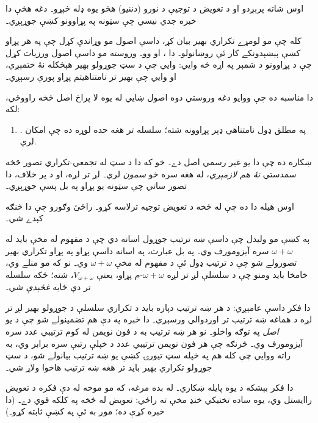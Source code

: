 \documentclass[../../../include/open-logic-section]{subfiles}
\begin{document}

اوس \limofsize{} شاته پرېږدو او د تعويض د توجيې د نورو
(دننيو) هڅو يوه ډله څېړو۔ دغه هڅې دا خبره جدي نيسي چې سټونه په
پړاوونو کښې جوړېږي۔

کله چې مو لومړے تکراري بهير بيان کړ، داسې اصول مو وړاندې کړل چې په
هر پړاو کښې پېښېدونکے کار ئې روښانولو۔ دا \stageshier، \stagesord او
\stagesacc وو۔ وروسته مو داسې اصول ورزيات کړل چې د پړاوونو د شمېر
په اړه څه وايي: \stagessucc{} وايي چې د سټ جوړولو بهير هېڅکله نۀ
ختمېږي، او \stagesinf{} وايي چې بهير تر نامتناهيتم پړاو پورې رسېږي۔

دا مناسبه ده چې ووايو دغه وروستي دوه اصول ښايي له يوه لا پراخ اصل
څخه راووځي، لکه:
\begin{enumerate}
	\item[] \stagesinex. په مطلق ډول نامتناهي ډېر پړاوونه شته؛
	سلسله تر هغه حده لوړه ده چې امکان لري.
\end{enumerate}
ښکاره ده چې دا يو غير رسمي اصل دے۔ خو که دا د سټ له تجمعي-تکراري
تصور څخه سمدستي \emph{نۀ هم لازمېږي}، له هغه سره خو \emph{سمون}
لري۔ لږ تر لږه، او د \limofsize پر خلاف، دا تصور ساتي چې سټونه
يو پړاو په بل پسې جوړېږي۔

اوس هيله دا ده چې له \stagesinex{} څخه د تعويض توجيه ترلاسه کړو۔
راځئ وګورو چې دا څنګه کېدے شي۔

په  کښې مو وليدل چې داسې ښه ترتيب جوړول
اسانه دي چې د مفهوم له مخې بايد له $\omega+\omega$ سره آيزومورف
وي۔ په بل عبارت، په اسانه داسې پړاو په پړاو تکراري بهير تصورولے شو
چې د ترتيب ډول ئې د مفهوم له مخې $\omega+\omega$ وي۔ نو که مو
\stagesinex منلے وي، خامخا بايد ومنو چې د سلسلې لږ تر لږه
$\omega+\omega$-م پړاو، يعنې $V_{\omega+\omega}$، شته؛ ځکه سلسله
تر دې ځايه \emph{غځېدې} شي۔

دا فکر داسې عامېږي: د هر ښه ترتيب دپاره بايد د تکراري سلسلې د
جوړولو بهير لږ تر لږه د هماغه ښه ترتيب تر اوږدوالي ورسېږي۔ دا خبره
په دې هم تضمينولے شو چې 
د يو \emph{اصل} په توګه واخلو۔ نو هر ښه ترتيب به د فون نويمن له
کوم ترتيبي عدد سره آيزومورف وي۔ څرنګه چې هر فون نويمن ترتيبي عدد د
خپلې رتبې سره برابر وي، 
به راته ووايي چې کله هم په خپله سټ تيورۍ کښې يو ښه ترتيب بيانولے
شو، د سټ جوړولو تکراري بهير بايد تر هغه ښه ترتيب هاخوا ولاړ شي۔

دا فکر بېشکه د \stagesinex يوه پايله ښکاري۔ له بده مرغه، که مو موخه
له دې فکره د تعويض راايستل وي، يوه ساده تخنيکي خنډ مخې ته راځي:
تعويض له  څخه په
کلکه قوي دے۔ (دا خبره \citet[\S13.2]{Potter2004} کړې ده؛ موږ به ئې
په  کښې ثابته کړو۔)
\end{document}
